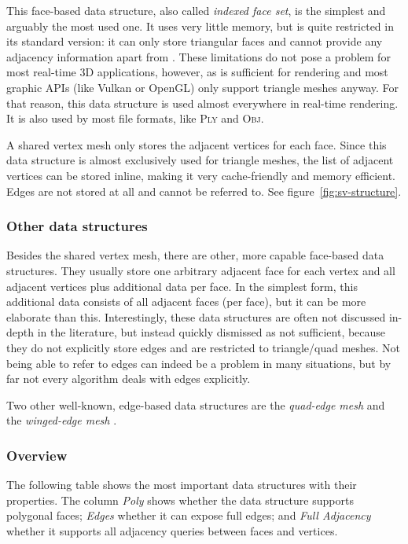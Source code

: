 This face-based data structure, also called \emph{indexed face set}, is the simplest and arguably the most used one.
It uses very little memory, but is quite restricted in its standard version:
it can only store triangular faces and cannot provide any adjacency information apart from .
These limitations do not pose a problem for most real-time 3D applications, however, as  is sufficient for rendering and most graphic APIs (like Vulkan or OpenGL) only support triangle meshes anyway.
For that reason, this data structure is used almost everywhere in real-time rendering.
It is also used by most file formats, like \textsc{Ply} and \textsc{Obj}.

A shared vertex mesh only stores the adjacent vertices for each face.
Since this data structure is almost exclusively used for triangle meshes, the list of adjacent vertices can be stored inline, making it very cache-friendly and memory efficient.
Edges are not stored at all and cannot be referred to. See figure~\ref{fig:sv-structure}.


\subsubsection*{Other data structures}

Besides the shared vertex mesh, there are other, more capable face-based data structures.
They usually store one arbitrary adjacent face for each vertex and all adjacent vertices plus additional data per face.
In the simplest form, this additional data consists of all adjacent faces (per face), but it can be more elaborate than this.
Interestingly, these data structures are often not discussed in-depth in the literature, but instead quickly dismissed as not sufficient, because they do not explicitly store edges and are restricted to triangle/quad meshes.
Not being able to refer to edges can indeed be a problem in many situations, but by far not every algorithm deals with edges explicitly.

Two other well-known, edge-based data structures are the \emph{quad-edge mesh} \cite{guibas1985primitives} and the \emph{winged-edge mesh} \cite{baumgart1972winged}.

\newpage
\subsubsection*{Overview}

The following table shows the most important data structures with their properties.
The column \emph{Poly} shows whether the data structure supports polygonal faces; \emph{Edges} whether it can expose full edges; and \emph{Full Adjacency} whether it supports all adjacency queries between faces and vertices.

